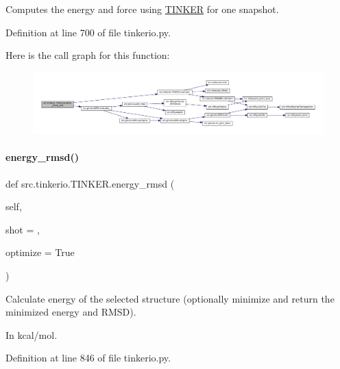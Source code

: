 Computes the energy and force using \hyperlink{classsrc_1_1tinkerio_1_1TINKER}{T\+I\+N\+K\+ER} for one snapshot. 



Definition at line 700 of file tinkerio.\+py.

Here is the call graph for this function\+:
\nopagebreak
\begin{figure}[H]
\begin{center}
\leavevmode
\includegraphics[width=350pt]{classsrc_1_1tinkerio_1_1TINKER_a99b420aae7470e1fb25ba0837ee7ef16_cgraph}
\end{center}
\end{figure}
\mbox{\label{classsrc_1_1tinkerio_1_1TINKER_a4aa91827c8809aa5f1d8a07ef66482d6}} 
\paragraph{\texorpdfstring{energy\+\_\+rmsd()}{energy\_rmsd()}}
{\footnotesize\ttfamily def src.\+tinkerio.\+T\+I\+N\+K\+E\+R.\+energy\+\_\+rmsd (\begin{DoxyParamCaption}\item[{}]{self,  }\item[{}]{shot = {},  }\item[{}]{optimize = {\ttfamily True} }\end{DoxyParamCaption})}



Calculate energy of the selected structure (optionally minimize and return the minimized energy and R\+M\+SD). 

In kcal/mol. 

Definition at line 846 of file tinkerio.\+py.

